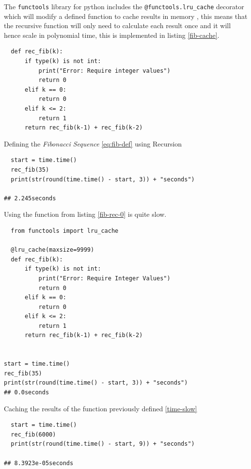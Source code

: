 \documentclass[a4paper,11pt,twoside]{article}
\begin{document}
The \texttt{functools} library for python includes the \texttt{@functools.lru\_cache} decorator
which will modify a defined function to cache results in memory
\cite{FunctoolsHigherorderFunctions}, this means that the recursive function will
only need to calculate each result once and it will hence scale in polynomial
time, this is implemented in listing \ref{fib-cache}.


\begin{listing}[htbp]
\begin{verbatim}
  def rec_fib(k):
      if type(k) is not int:
          print("Error: Require integer values")
          return 0
      elif k == 0:
          return 0
      elif k <= 2:
          return 1
      return rec_fib(k-1) + rec_fib(k-2)
\end{verbatim}
\caption{\label{fib-rec-0}Defining the \emph{Fibonacci Sequence} \eqref{eq:fib-def} using Recursion}
\end{listing}

\begin{listing}[htbp]
\begin{verbatim}
  start = time.time()
  rec_fib(35)
  print(str(round(time.time() - start, 3)) + "seconds")

## 2.245seconds
\end{verbatim}
\caption{\label{time-slow}Using the function from listing \ref{fib-rec-0} is quite slow.}
\end{listing}


\begin{listing}[htbp]
\begin{verbatim}
  from functools import lru_cache

  @lru_cache(maxsize=9999)
  def rec_fib(k):
      if type(k) is not int:
          print("Error: Require Integer Values")
          return 0
      elif k == 0:
          return 0
      elif k <= 2:
          return 1
      return rec_fib(k-1) + rec_fib(k-2)


start = time.time()
rec_fib(35)
print(str(round(time.time() - start, 3)) + "seconds")
## 0.0seconds
\end{verbatim}
\caption{\label{fib-cache}Caching the results of the function previously defined \ref{time-slow}}
\end{listing}

\begin{verbatim}
  start = time.time()
  rec_fib(6000)
  print(str(round(time.time() - start, 9)) + "seconds")

## 8.3923e-05seconds
\end{verbatim}
\end{document}

